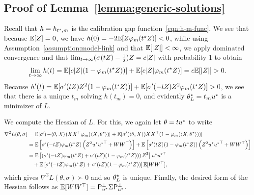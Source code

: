 \subsection{Proof of Lemma~\ref{lemma:generic-solutions}}
\label{sec:proof-generic-solutions}

Recall that $h = h_{t^\star, m}$ is the calibration
gap function~\eqref{eqn:h-m-func}.
We see that because $\mathbb{E}[Z] = 0$, we have
$h(0) = -2 \mathbb{E}[Z \varphi_m(t^\star Z)] < 0$,
while using Assumption~\ref{assumption:model-link} and that
$\mathbb{E}[|Z|] < \infty$, we apply dominated convergence and that
$\lim_{t \to \infty} (\sigma(t Z) - \frac{1}{2}) Z = c|Z|$ with probability 1
to obtain
\begin{align*}
	\lim_{t \to \infty} h(t) = \mathbb{E}[c|Z| (1 - \varphi_m(t^\star Z))]
	+ \mathbb{E}[c |Z| \varphi_m(t^\star Z)] = c \mathbb{E}[|Z|] > 0.
\end{align*}
Because $h'(t) = \mathbb{E}[\sigma'(tZ) Z^2 (1 - \varphi_m(t^\star Z))]
+ \mathbb{E}[\sigma'(-tZ) Z^2 \varphi_m(t^\star Z)] > 0$, we see that there
is a unique $t_m$ solving $h(t_m) = 0$, and evidently
$\theta^\star_L = t_m u^\star$ is a minimizer of $L$.

We compute the Hessian of $L$. For this,
we again let $\theta = t u^\star$ to write
\begin{align*}
	\nabla^2 L(\theta, \sigma) & = \mathbb{E}[\sigma'(-\langle\theta, X\rangle) XX^\top \varphi_m(\langle X, \theta^\star\rangle)]
	+ \mathbb{E}[\sigma'(\langle\theta, X\rangle) XX^\top (1 - \varphi_m(\langle X, \theta^\star\rangle))] \\
	& = \mathbb{E}\left[\sigma'(-t Z) \varphi_m(t^\star Z)
	\left(Z^2 u^\star {u^\star}^\top + WW^\top\right)\right]
	+ \mathbb{E}\left[\sigma'(t Z) (1 - \varphi_m(t^\star Z))
	\left(Z^2 u^\star {u^\star}^\top + WW^\top \right)\right] \\
	& = \mathbb{E}\left[\left(\sigma'(-tZ) \varphi_m(t^\star Z)
	+ \sigma'(tZ) (1 - \varphi_m(t^\star Z)) \right) Z^2\right]
	u^\star {u^\star}^\top \\
	& \quad + \mathbb{E}\left[\sigma'(-tZ) \varphi_m(t^\star Z)
	+ \sigma'(tZ) (1 - \varphi_m(t^\star Z))\right] \mathbb{E}[WW^\top],
\end{align*}
which gives $\nabla^2 L(\theta, \sigma) \succ 0$ and so $\theta^\star_L$ is
unique.  Finally, the desired form of the Hessian follows as $\mathbb{E}[WW^\top] =
\mathsf{P}_{u^\star}^\perp \Sigma \mathsf{P}_{u^\star}^\perp$.

